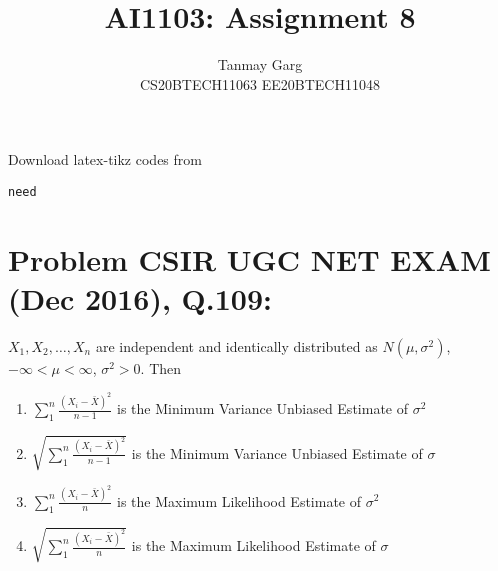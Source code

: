 \documentclass[journal,12pt,twocolumn]{IEEEtran}
\begin{document}
     \def\rightbox#1{\makebox[0in][r]{#1}}
     \def\centbox#1{\makebox[0in]{#1}}
     \def\topbox#1{\raisebox{-\baselineskip}[0in][0in]{#1}}
     \def\midbox#1{\raisebox{-0.5\baselineskip}[0in][0in]{#1}}
\vspace{3cm}
\title{AI1103: Assignment 8}
\author{Tanmay Garg \\CS20BTECH11063 EE20BTECH11048}
\maketitle
\newpage
\bigskip
\renewcommand{\thefigure}{\theenumi}
\renewcommand{\thetable}{\theenumi}
%
Download latex-tikz codes from 
%
\begin{lstlisting}
need
\end{lstlisting}
\section*{Problem CSIR UGC NET EXAM (Dec 2016), Q.109: }
$X_1,X_2,\ldots,X_n$ are independent and identically
distributed as $N(\mu, \sigma^2)$, $-\infty < \mu < \infty$, $\sigma^2 > 0$. Then
\begin{enumerate}
    \item $\sum_1^n\frac{(X_i-\bar{X})^2}{n-1}$ is the Minimum Variance Unbiased Estimate of $\sigma^2$\\
    \item $\sqrt{\sum_1^n\frac{(X_i-\bar{X})^2}{n-1}}$ is the Minimum Variance Unbiased Estimate of $\sigma$\\
    \item $\sum_1^n\frac{(X_i-\bar{X})^2}{n}$ is the Maximum Likelihood Estimate of $\sigma^2$\\
    \item $\sqrt{\sum_1^n\frac{(X_i-\bar{X})^2}{n}}$ is the Maximum Likelihood \qquad Estimate of $\sigma$
\end{enumerate}
\end{document}

